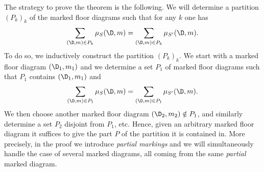 The strategy to prove the theorem is the following. We will determine a partition $(P_k)_k$ of the marked floor diagrams such that for any $k$ one has
\[ \sum_{(\D,m) \in P_k} \mu_S(\D,m) = \sum_{(\D,m) \in P_k} \mu_{S'}(\D,m). \]
To do so, we inductively construct the partition $(P_k)_k$. We start with a marked floor diagram $(\D_1,m_1)$ and we determine a set $P_1$ of marked floor diagrams such that $P_1$ contains $(\D_1,m_1)$ and
\[ \sum_{(\D,m) \in P_1} \mu_S(\D,m) = \sum_{(\D,m) \in P_1} \mu_{S'}(\D,m). \]
We then choose another marked floor diagram $(\D_2,m_2) \notin P_1$, and similarly determine a set $P_2$ disjoint from $P_1$, etc. Hence, given an arbitrary marked floor diagram it suffices to give the part $P$ of the partition it is contained in.
More precisely, in the proof we introduce \emph{partial markings} and we will simultaneously handle the case of several marked diagrams, all coming from the same \emph{partial} marked diagram. 

